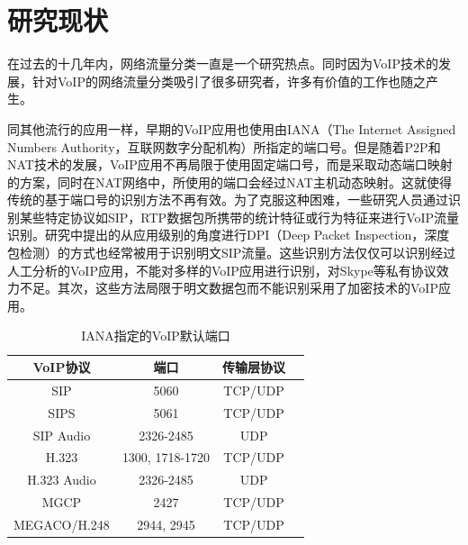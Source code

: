
\section{研究现状}
\label{sec:researchsituation}
在过去的十几年内，网络流量分类一直是一个研究热点。同时因为VoIP技术的发展，针对VoIP的网络流量分类吸引了很多研究者，许多有价值的工作也随之产生。

同其他流行的应用一样，早期的VoIP应用也使用由IANA（The Internet Assigned Numbers Authority，互联网数字分配机构）所指定的端口号。但是随着P2P和NAT技术的发展，VoIP应用不再局限于使用固定端口号，而是采取动态端口映射的方案，同时在NAT网络中，所使用的端口会经过NAT主机动态映射。这就使得传统的基于端口号的识别方法不再有效。为了克服这种困难，一些研究人员\supercite{14, 16, 13}通过识别某些特定协议如SIP，RTP数据包所携带的统计特征或行为特征来进行VoIP流量识别。研究\supercite{18}中提出的从应用级别的角度进行DPI（Deep Packet Inspection，深度包检测）的方式也经常被用于识别明文SIP流量。这些识别方法仅仅可以识别经过人工分析的VoIP应用，不能对多样的VoIP应用进行识别，对Skype等私有协议效力不足。其次，这些方法局限于明文数据包而不能识别采用了加密技术的VoIP应用。

\begin{table} [thb]
\caption{IANA指定的VoIP默认端口}\label{tab:21}
\small
\centering
{
\begin{tabular}{cccc}
  \toprule
        \textbf{VoIP协议} & \textbf{端口} & \textbf{传输层协议} \\
  \midrule
        SIP & 5060 & TCP/UDP \\
        SIPS & 5061 & TCP/UDP \\
        SIP Audio & 2326-2485 & UDP\\
        H.323 & 1300, 1718-1720 & TCP/UDP\\
        H.323 Audio & 2326-2485 & UDP\\
        MGCP & 2427 & TCP/UDP\\
        MEGACO/H.248 & 2944, 2945 & TCP/UDP\\
 \bottomrule
\end{tabular}
}
\end{table}

